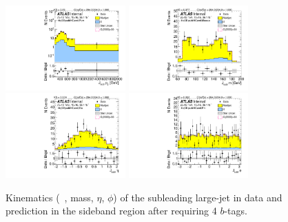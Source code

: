 \begin{figure}[htb!]
\begin{center}
\includegraphics[width=0.41\textwidth,angle=-90]{figures/boosted/Sideband/b77_FourTag_Sideband_sublHCand_Pt_m_1.pdf}
\includegraphics[width=0.41\textwidth,angle=-90]{figures/boosted/Sideband/b77_FourTag_Sideband_sublHCand_Mass_s.pdf}\\
\includegraphics[width=0.41\textwidth,angle=-90]{figures/boosted/Sideband/b77_FourTag_Sideband_sublHCand_Eta.pdf}
\includegraphics[width=0.41\textwidth,angle=-90]{figures/boosted/Sideband/b77_FourTag_Sideband_sublHCand_Phi.pdf}
  \caption{Kinematics (\pt~, mass, $\eta$, $\phi$) of the subleading large-\R jet in data and prediction in the sideband region after requiring 4 $b$-tags.}
  \label{fig:boosted-4b-sideband-ak10-subl}
\end{center}
\end{figure}

